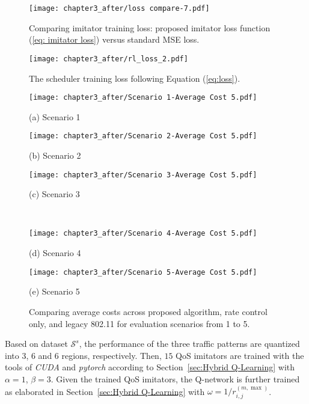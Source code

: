 \begin{figure}[!t]
    \centering
    \texttt{[image: chapter3\_after/loss compare-7.pdf]}
    \caption{Comparing imitator training loss: proposed imitator loss function (\ref{eq: imitator loss}) versus standard MSE loss.}
    \label{fig:imitator training loss} %
\end{figure}
\begin{figure}[!t]
    \centering
    \texttt{[image: chapter3\_after/rl\_loss\_2.pdf]}
    \caption{The scheduler training loss following Equation (\ref{eq:loss}).}
    \label{fig:scheduler training loss} %
\end{figure}
\begin{figure*}[!t]
    \centering
    \begin{minipage}[b]{0.32\linewidth}
        \texttt{[image: chapter3\_after/Scenario 1-Average Cost 5.pdf]}
        \caption*{(a) Scenario 1}
    \end{minipage}
    \begin{minipage}[b]{0.32\linewidth}
        \texttt{[image: chapter3\_after/Scenario 2-Average Cost 5.pdf]}
        \caption*{(b) Scenario 2}
    \end{minipage}
    \begin{minipage}[b]{0.32\linewidth}
        \texttt{[image: chapter3\_after/Scenario 3-Average Cost 5.pdf]}
        \caption*{(c) Scenario 3}
    \end{minipage} \\
    \begin{minipage}[b]{0.32\linewidth}
        \centering
        \texttt{[image: chapter3\_after/Scenario 4-Average Cost 5.pdf]}
        \caption*{(d) Scenario 4}
    \end{minipage}
    \begin{minipage}[b]{0.32\linewidth}
        \texttt{[image: chapter3\_after/Scenario 5-Average Cost 5.pdf]}
        \caption*{(e) Scenario 5}
    \end{minipage}
    \caption{Comparing average costs across proposed algorithm, rate control only, and legacy 802.11 for evaluation scenarios from 1 to 5.}
    \label{fig:Average cost comparison of proposed algorithm in Scenario 1, 2, 3, 4 and 5.} %
\end{figure*}


Based on dataset $\mathscr{S}^s$, the performance of the three traffic patterns are quantized into 3, 6 and 6 regions, respectively. Then, $15$ QoS imitators are trained with the tools of \textit{CUDA}\cite{cuda} and \textit{pytorch}\cite{NEURIPS2019_9015} according to Section~\ref{sec:Hybrid Q-Learning} with $\alpha=1$, $\beta=3$. Given the trained QoS imitators, the Q-network is further trained as elaborated in Section~\ref{sec:Hybrid Q-Learning} with $\omega=1/{r}^{(m,\max)}_{i,j}$.

